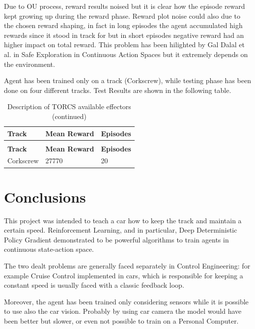 \documentclass[Lau,oneside,noexaminfo]{sapthesis} %
\begin{document}
Due to OU process, reward results noised but it is clear how the episode reward kept growing up during the reward phase. Reward plot noise could also due to the chosen reward shaping, in fact in long episodes the agent accumulated high rewards since it stood in track for but in short episodes negative reward had an higher impact on total reward. This problem has been hilighted by Gal Dalal et al. in Safe Exploration in Continuous Action Spaces \cite{SAFEEXPLORATION} but it extremely depends on the environment.

Agent has been trained only on a track (Corkscrew), while testing phase has been done on four different tracks. Test Results are shown in the following table.

\begin{longtable}{p{}p{}p{}}
\caption{Test Results}\\
\toprule
\textbf{Track}          &  \textbf{Mean Reward}   & \textbf{Episodes}   \\
\midrule
\endfirsthead
\caption{Description of TORCS available effectors (continued)}\\
\toprule
\textbf{Track}          &  \textbf{Mean Reward}   & \textbf{Episodes}   \\
\midrule
\endhead
\bottomrule
\endfoot
Corkscrew    & 27770  & 20    \\
\end{longtable}

\chapter{Conclusions}
This project was intended to teach a car how to keep the track and maintain a certain speed. Reinforcement Learning, and in particular, Deep Deterministic Policy Gradient demonstrated to be powerful algorithms to train agents in continuous state-action space. 
 
The two dealt problems are generally faced separately in Control Engineering: for example Cruise Control implemented in cars, which is responsible for keeping a constant speed is usually faced with a classic feedback loop.  

Moreover, the agent has been trained only considering sensors while it is possible to use also the car vision. Probably by using car camera the model would have been better but slower, or even not possible to train on a Personal Computer.
\backmatter

\cleardoublepage
{} %
{}

\end{document}
